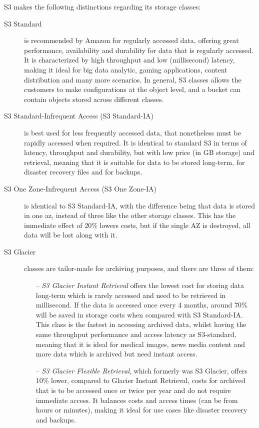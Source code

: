 S3 makes the following distinctions regarding its storage classes: ~\cite{s3faq}
\begin{description}
    \item[S3 Standard] is recommended by Amazon for regularly accessed data, offering great performance, availability and durability for data that is regularly accessed. It is characterized by high throughput and low (millisecond) latency, making it ideal for big data analytic, gaming applications, content distribution and many more scenarios. In general, S3 classes allows the customers to make configurations at the object level, and a bucket can contain objects stored across different classes.

    \item [S3 Standard-Infrequent Access (S3 Standard-IA)] is best used for less frequently accessed data, that nonetheless must be rapidly accessed when required. It is identical to standard S3 in terms of latency, throughput and durability, but with low price (in GB storage) and retrieval, meaning that it is suitable for data to be stored long-term, for disaster recovery files and for backups.

    \item[S3 One Zone-Infrequent Access (S3 One Zone-IA)] is identical to S3 Standard-IA, with the difference being that data is stored in one \ac{az}, instead of three like the other storage classes. This has the immediate effect of 20\% lowers costs, but if the single AZ is destroyed, all data will be lost along with it.

    \item[S3 Glacier] classes are tailor-made for archiving purposes, and there are three of them:
    \begin{itemize}
        \item [--] \textit{S3 Glacier Instant Retrieval} offers the lowest cost for storing data long-term which is rarely accessed and need to be retrieved in millisecond. If the data is accessed once every 4 months, around 70\% will be saved in storage costs when compared with S3 Standard-IA. This class is the fastest in accessing archived data, whilst having the same throughput performance and access latency as S3-standard, meaning that it is ideal for medical images, news media content and more data which is archived but need instant access.

        \item[--] \textit{S3 Glacier Flexible Retrieval}, which formerly was S3 Glacier, offers 10\% lower, compared to Glacier Instant Retrieval, costs for archived that is to be accessed once or twice per year and do not require immediate access. It balances costs and access times (can be from hours or minutes), making it ideal for use cases like disaster recovery and backups.


\end{itemize}
\end{description}
